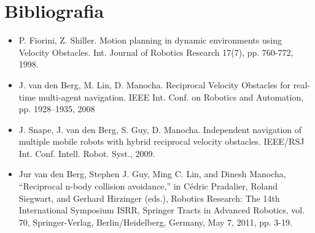 
\chapter{Bibliografia}
\label{cap:bib}

\begin{itemize}

\item P. Fiorini, Z. Shiller. Motion planning in dynamic environments using Velocity Obstacles. Int.
Journal of Robotics Research 17(7), pp. 760-772, 1998.

 \item J. van den Berg, M. Lin, D. Manocha. Reciprocal Velocity Obstacles for real-time multi-agent
navigation. IEEE Int. Conf. on Robotics and Automation, pp. 1928–1935, 2008

 \item J. Snape, J. van den Berg, S. Guy, D. Manocha. Independent navigation of multiple mobile
robots with hybrid reciprocal velocity obstacles. IEEE/RSJ Int. Conf. Intell. Robot. Syst.,
2009.

\item Jur van den Berg, Stephen J. Guy, Ming C. Lin, and Dinesh Manocha, “Reciprocal n-body collision avoidance,” in Cédric Pradalier, Roland Siegwart, and Gerhard Hirzinger (eds.), Robotics Research: The 14th International Symposium ISRR, Springer Tracts in Advanced Robotics, vol. 70, Springer-Verlag, Berlin/Heidelberg, Germany, May 7, 2011, pp. 3-19.

\end{itemize}